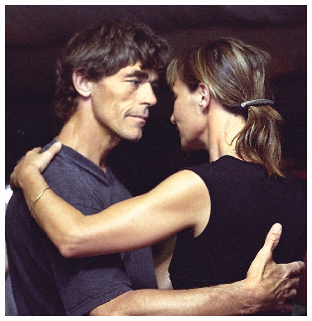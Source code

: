 \begin{center}

\vspace{5cm}

\label{OneRicardo}\includegraphics[scale=1.5]{dance/Eltaita-reduc}

\end{center}
